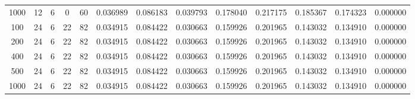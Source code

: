 \begin{table}[h]
\begin{tabular}{ccccccccccccc}
1000 & 12 & 6 & 0 & 60 & 0.036989 & 0.086183 & 0.039793 & 0.178040 & 0.217175 & 0.185367 & 0.174323 & 0.000000 \\
100 & 24 & 6 & 22 & 82 & 0.034915 & 0.084422 & 0.030663 & 0.159926 & 0.201965 & 0.143032 & 0.134910 & 0.000000 \\
200 & 24 & 6 & 22 & 82 & 0.034915 & 0.084422 & 0.030663 & 0.159926 & 0.201965 & 0.143032 & 0.134910 & 0.000000 \\
400 & 24 & 6 & 22 & 82 & 0.034915 & 0.084422 & 0.030663 & 0.159926 & 0.201965 & 0.143032 & 0.134910 & 0.000000 \\
500 & 24 & 6 & 22 & 82 & 0.034915 & 0.084422 & 0.030663 & 0.159926 & 0.201965 & 0.143032 & 0.134910 & 0.000000 \\
1000 & 24 & 6 & 22 & 82 & 0.034915 & 0.084422 & 0.030663 & 0.159926 & 0.201965 & 0.143032 & 0.134910 & 0.000000 \\
\bottomrule
\end{tabular}
\end{table}

